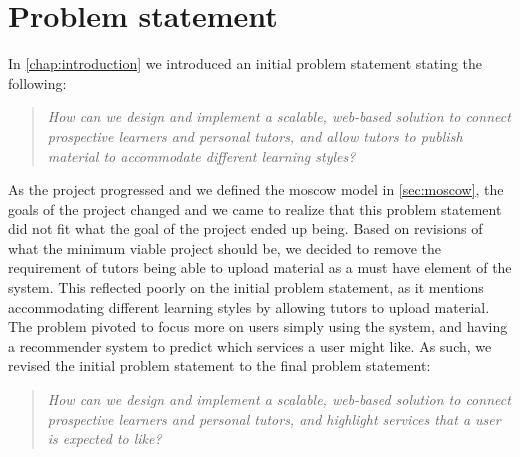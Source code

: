 \section{Problem statement}
In \autoref{chap:introduction} we introduced an initial problem statement stating the following:
\begin{quote}
    \textit{How can we design and implement a scalable, web-based solution to connect prospective learners and personal tutors, and allow tutors to publish material to accommodate different learning styles?}
\end{quote}
As the project progressed and we defined the moscow model in \autoref{sec:moscow}, the goals of the project changed and we came to realize that this problem statement did not fit what the goal of the project ended up being.
Based on revisions of what the minimum viable project should be, we decided to remove the requirement of tutors being able to upload material as a must have element of the system.
This reflected poorly on the initial problem statement, as it mentions accommodating different learning styles by allowing tutors to upload material.
The problem pivoted to focus more on users simply using the system, and having a recommender system to predict which services a user might like.
As such, we revised the initial problem statement to the final problem statement:
\begin{quote}
    \textit{How can we design and implement a scalable, web-based solution to connect prospective learners and personal tutors, and highlight services that a user is expected to like?}
\end{quote}
